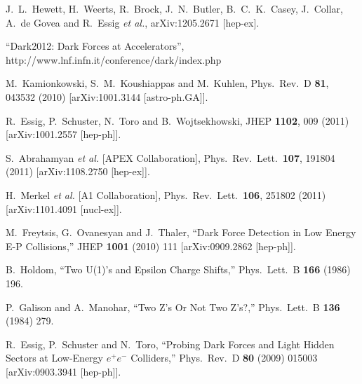
  J.~L.~Hewett, H.~Weerts, R.~Brock, J.~N.~Butler, B.~C.~K.~Casey, J.~Collar, A.~de Govea and R.~Essig {\it et al.}, arXiv:1205.2671 [hep-ex].
  

  ``Dark2012: Dark Forces at Accelerators'', http://www.lnf.infn.it/conference/dark/index.php

  M.~Kamionkowski, S.~M.~Koushiappas and M.~Kuhlen,
  Phys.\ Rev.\ D {\bf 81}, 043532 (2010)
  [arXiv:1001.3144 [astro-ph.GA]].


  R.~Essig, P.~Schuster, N.~Toro and B.~Wojtsekhowski,
  JHEP {\bf 1102}, 009 (2011)
  [arXiv:1001.2557 [hep-ph]].

  S.~Abrahamyan {\it et al.}  [APEX Collaboration],
  Phys.\ Rev.\ Lett.\  {\bf 107}, 191804 (2011)
  [arXiv:1108.2750 [hep-ex]].

  H.~Merkel {\it et al.}  [A1 Collaboration],
  Phys.\ Rev.\ Lett.\  {\bf 106}, 251802 (2011)
  [arXiv:1101.4091 [nucl-ex]].

M.~Freytsis, G.~Ovanesyan and J.~Thaler,
``Dark Force Detection in Low Energy E-P Collisions,''
JHEP {\bf 1001} (2010) 111
[arXiv:0909.2862 [hep-ph]].

B.~Holdom,
``Two U(1)'s and Epsilon Charge Shifts,''
Phys.\ Lett.\ B {\bf 166} (1986) 196.

P.~Galison and A.~Manohar,
``Two Z's Or Not Two Z's?,''
Phys.\ Lett.\ B {\bf 136} (1984) 279.

R.~Essig, P.~Schuster and N.~Toro,
``Probing Dark Forces and Light Hidden Sectors at Low-Energy $e^+e^-$ Colliders,''
Phys.\ Rev.\ D {\bf 80} (2009) 015003
[arXiv:0903.3941 [hep-ph]].

